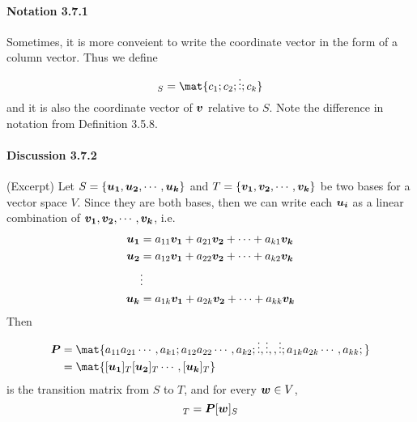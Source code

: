 \documentclass[a4paper]{article}
\begin{document}
\begin{multicols*}{3}
      \paragraph{Notation 3.7.1} Sometimes, it is more conveient to write the coordinate vector in the form of a column vector. Thus we define
        \begin{equation*}
          [\v]_S = \mat{c_1; c_2; \vdots; c_k}
        \end{equation*}
        and it is also the coordinate vector of $\v$ relative to $S$. Note the difference in notation from Definition 3.5.8.
        \paragraph{Discussion 3.7.2} (Excerpt) Let $S = \vset{\u[1], \u[2], \cdots, \u[k]}$ and $T = \vset{\v[1], \v[2], \cdots, \v[k]}$ be two bases for a vector space $V$. Since they are both bases, then we can write each $\u[i]$ as a linear combination of $\v[1], \v[2], \cdots, \v[k]$, i.e.
          \begin{align*}
            \u[1] &= a_{11} \v[1] + a_{21} \v[2] + \cdots + a_{k1} \v[k] \\
            \u[2] &= a_{12} \v[1] + a_{22} \v[2] + \cdots + a_{k2} \v[k] \\
                  & \vdots \\
            \u[k] &= a_{1k} \v[1] + a_{2k} \v[2] + \cdots + a_{kk} \v[k]
          \end{align*}
          Then
          \begin{align*}
            \P &= \mat{
              a_{11} a_{21} \cdots, a_{k1};
              a_{12} a_{22} \cdots, a_{k2};
              \vdots, \vdots, , \vdots;
              a_{1k} a_{2k} \cdots, a_{kk};
            } \\
            &= \mat{[\u[1]]_T [\u[2]]_T \cdots, [\u[k]]_T}
          \end{align*}
          is the transition matrix from $S$ to $T$, and for every $\w \in V$,
          \begin{equation*}
            [\w]_T = \P [\w]_S
          \end{equation*}

\end{multicols*}
\end{document}
